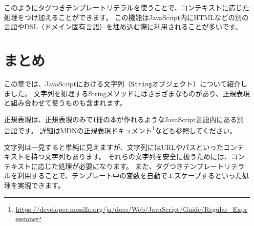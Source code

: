 このようにタグつきテンプレートリテラルを使うことで、コンテキストに応じた処理をつけ加えることができます。
この機能はJavaScript内にHTMLなどの別の言語やDSL（ドメイン固有言語）を埋め込む際に利用されることが多いです。

\hypertarget{string-summary}{%
\section{まとめ}\label{string-summary}}

この章では、JavaScriptにおける文字列（\texttt{String}オブジェクト）について紹介しました。
文字列を処理するStringメソッドにはさまざまなものがあり、正規表現と組み合わせて使うものも含まれます。

正規表現は、正規表現のみで1冊の本が作れるようなJavaScript言語内にある別言語です。
詳細は\href{https://developer.mozilla.org/ja/docs/Web/JavaScript/Guide/Regular_Expressions}{MDNの正規表現ドキュメント}\footnote{\url{https://developer.mozilla.org/ja/docs/Web/JavaScript/Guide/Regular_Expressions}}なども参照してください。

文字列は一見すると単純に見えますが、文字列にはURLやパスといったコンテキストを持つ文字列もあります。
それらの文字列を安全に扱うためには、コンテキストに応じた処理が必要になります。
また、タグつきテンプレートリテラルを利用することで、テンプレート中の変数を自動でエスケープするといった処理を実現できます。
